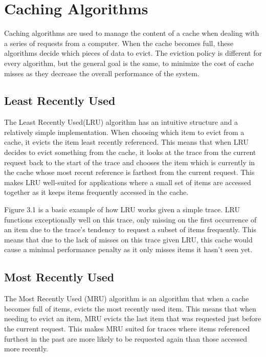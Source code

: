 \chapter{Caching Algorithms}
Caching algorithms are used to manage the content of a cache when dealing with a series of requests from a computer. When the cache becomes full, these algorithms decide which pieces of data to evict. The eviction policy is different for every algorithm, but the general goal is the same, to minimize the cost of cache misses as they decrease the overall performance of the system.


\section{Least Recently Used}


The Least Recently Used(LRU) algorithm has an intuitive structure and a relatively simple implementation. When choosing which item to evict from a cache, it evicts the item least recently referenced. This means that when LRU decides to evict something from the cache, it looks at the trace from the current request back to the start of the trace and chooses the item which is currently in the cache whose most recent reference is farthest from the current request. This makes LRU well-suited for applications where a small set of items are accessed together as it keeps items frequently accessed in the cache.


Figure 3.1 is a basic example of how LRU works given a simple trace. LRU functions exceptionally well on this trace, only missing on the first occurrence of an item due to the trace's tendency to request a subset of items frequently. This means that due to the lack of misses on this trace given LRU, this cache would cause a minimal performance penalty as it only misses items it hasn't seen yet. 




\section{Most Recently Used}
The Most Recently Used (MRU) algorithm is an algorithm that when a cache becomes full of items, evicts the most recently used item. This means that when needing to evict an item, MRU evicts the last item that was requested just before the current request. This makes MRU suited for traces where items referenced furthest in the past are more likely to be requested again than those accessed more recently.

